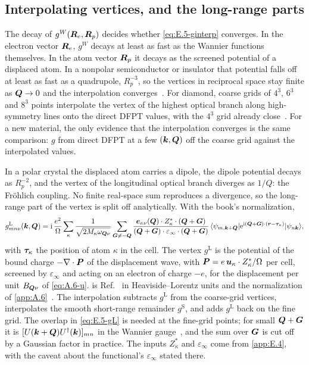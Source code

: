\subsection{Interpolating vertices, and the long-range parts}

The decay of $g^W(\bm{R}_e,\bm{R}_p)$ decides whether \cref{eq:E.5-ginterp} converges. In the electron vector $\bm{R}_e$, $g^W$ decays at least as fast as the Wannier functions themselves. In the atom vector $\bm{R}_p$ it decays as the screened potential of a displaced atom. In a nonpolar semiconductor or insulator that potential falls off at least as fast as a quadrupole, $R_p^{-3}$, so the vertices in reciprocal space stay finite as $\bm{Q}\to0$ and the interpolation converges~\cite[Sect.~VI.A.2]{giustino2017electron}. For diamond, coarse grids of $4^3$, $6^3$ and $8^3$ points interpolate the vertex of the highest optical branch along high-symmetry lines onto the direct DFPT values, with the $4^3$ grid already close~\cite[Fig.~6]{giustino2017electron}. For a new material, the only evidence that the interpolation converges is the same comparison: $g$ from direct DFPT at a few $(\bm{k},\bm{Q})$ off the coarse grid against the interpolated values.

In a polar crystal the displaced atom carries a dipole, the dipole potential decays as $R_p^{-2}$, and the vertex of the longitudinal optical branch diverges as $1/Q$: the Fr\"ohlich coupling. No finite real-space sum reproduces a divergence, so the long-range part of the vertex is split off analytically. With the book's normalization,
\begin{equation}
  g^{\mathrm{L}}_{mn\nu}(\bm{k},\bm{Q}) = \mathrm{i}\,\frac{e^2}{\Omega}\sum_\kappa\frac{1}{\sqrt{2M_\kappa\omega_{\bm{Q}\nu}}}
  \sum_{\bm{G}\ne-\bm{Q}}\frac{\bm{e}_{\kappa\nu}(\bm{Q})\cdot Z^*_\kappa\cdot(\bm{Q}+\bm{G})}{(\bm{Q}+\bm{G})\cdot\varepsilon_\infty\cdot(\bm{Q}+\bm{G})}\,
  \langle\psi_{m,\bm{k}+\bm{Q}}|\mathrm{e}^{\mathrm{i}(\bm{Q}+\bm{G})\cdot(\bm{r}-\bm{\tau}_\kappa)}|\psi_{n\bm{k}}\rangle ,
  \label{eq:E.5-gL}
\end{equation}
with $\bm{\tau}_\kappa$ the position of atom $\kappa$ in the cell. The vertex $g^{\mathrm{L}}$ is the potential of the bound charge $-\nabla\cdot\bm{P}$ of the displacement wave, with $\bm{P} = e\,\bm{u}_\kappa\cdot Z^*_\kappa/\Omega$ per cell, screened by $\varepsilon_\infty$ and acting on an electron of charge $-e$, for the displacement per unit $B_{\bm{Q}\nu}$ of \cref{eq:A.6-u}.  is Ref.~\cite[Eq.~(180)]{giustino2017electron} in Heaviside--Lorentz units and the normalization of \cref{app:A.6}~\cite{verdi2015frohlich}. The interpolation subtracts $g^{\mathrm{L}}$ from the coarse-grid vertices, interpolates the smooth short-range remainder $g^{\mathrm{S}}$, and adds $g^{\mathrm{L}}$ back on the fine grid. The overlap in \cref{eq:E.5-gL} is needed at the fine-grid points; for small $\bm{Q}+\bm{G}$ it is $[U(\bm{k}+\bm{Q})U^\dagger(\bm{k})]_{mn}$ in the Wannier gauge~\cite[Sect.~VI.A.3]{giustino2017electron}, and the sum over $\bm{G}$ is cut off by a Gaussian factor in practice. The inputs $Z^*_\kappa$ and $\varepsilon_\infty$ come from \cref{app:E.4}, with the caveat about the functional's $\varepsilon_\infty$ stated there.

